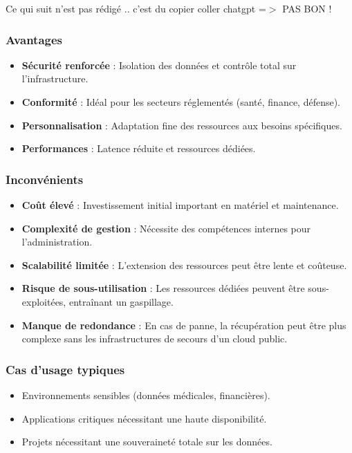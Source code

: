 \documentclass{report} %
\begin{document}
{\color{red} Ce qui suit n'est pas rédigé .. c'est du copier coller chatgpt  =$>$ PAS BON !}
\subsubsection{Avantages}
\begin{itemize}
    \item \textbf{Sécurité renforcée} : Isolation des données et contrôle total sur l’infrastructure.
    \item \textbf{Conformité} : Idéal pour les secteurs réglementés (santé, finance, défense).
    \item \textbf{Personnalisation} : Adaptation fine des ressources aux besoins spécifiques.
    \item \textbf{Performances} : Latence réduite et ressources dédiées.
\end{itemize}

\subsubsection{Inconvénients}
\begin{itemize}
    \item \textbf{Coût élevé} : Investissement initial important en matériel et maintenance.
    \item \textbf{Complexité de gestion} : Nécessite des compétences internes pour l’administration.
    \item \textbf{Scalabilité limitée} : L’extension des ressources peut être lente et coûteuse.
    \item \textbf{Risque de sous-utilisation} : Les ressources dédiées peuvent être sous-exploitées, entraînant un gaspillage.
    \item \textbf{Manque de redondance} : En cas de panne, la récupération peut être plus complexe sans les infrastructures de secours d’un cloud public.
\end{itemize}

\subsubsection{Cas d’usage typiques}
\begin{itemize}
    \item Environnements sensibles (données médicales, financières).
    \item Applications critiques nécessitant une haute disponibilité.
    \item Projets nécessitant une souveraineté totale sur les données.
\end{itemize}
\end{document}
